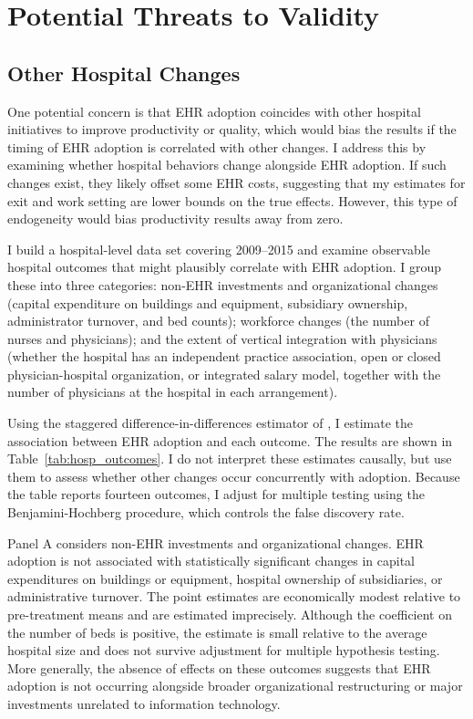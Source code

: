 \documentclass[12pt]{article}
\begin{document}
\section{Potential Threats to Validity}\label{sec:alt}

\subsection{Other Hospital Changes}\label{sec:hospanalysis}

One potential concern is that EHR adoption coincides with other hospital
initiatives to improve productivity or quality, which would bias the results if the timing of EHR adoption is correlated with other changes. I address this by examining whether hospital behaviors change alongside EHR adoption. If such changes exist, they likely offset some EHR costs, suggesting that my estimates for exit and work setting are lower bounds on the true effects. However, this type of endogeneity would bias productivity results away from zero. 

I build a hospital-level data set covering 2009--2015 and examine observable hospital outcomes that might plausibly correlate with EHR adoption. I group these into three categories: non-EHR investments and organizational changes (capital expenditure on buildings and equipment, subsidiary ownership, administrator turnover, and bed counts); workforce changes (the number of nurses and physicians); and the extent of vertical integration with physicians (whether the hospital has an independent practice association, open or closed physician-hospital organization, or integrated salary model, together with the number of physicians at the hospital in each arrangement). 

Using the staggered difference-in-differences estimator of
\citet{callaway2021difference}, I
estimate the association between EHR adoption and each outcome. The results are shown in Table~\ref{tab:hosp_outcomes}. I do not interpret these estimates causally, but use them to assess whether other changes occur concurrently with adoption. Because the table reports fourteen outcomes, I adjust for multiple testing using the Benjamini-Hochberg procedure, which controls the false discovery rate. 



Panel A considers non-EHR investments and organizational changes. EHR adoption is not associated with statistically significant changes in capital expenditures on buildings or equipment, hospital ownership of subsidiaries, or administrative turnover. The point estimates are economically modest relative to pre-treatment means and are estimated imprecisely. Although the coefficient on the number of beds is positive, the estimate is small relative to the average hospital size and does not survive adjustment for multiple hypothesis testing. More generally, the absence of effects on these outcomes suggests that EHR adoption is not occurring alongside broader organizational restructuring or major investments unrelated to information technology.
\end{document}
